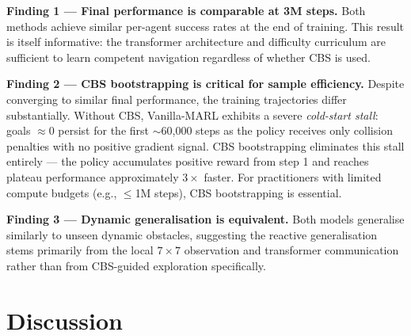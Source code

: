 \documentclass[letterpaper,twocolumn,10pt]{article}
\begin{document}
\begin{table}[h]
\centering
\caption{Ablation: CBS-Bootstrapped vs.\ Vanilla-MARL (no CBS). Per-agent success
  rate over 100 episodes; dynamic success under $K=4$ mixed obstacles over 50 episodes.}
\label{tab:ablation}
\end{table}

\textbf{Finding 1 --- Final performance is comparable at 3M steps.}
Both methods achieve similar per-agent success rates at the end of training. This
result is itself informative: the transformer architecture and difficulty curriculum
are sufficient to learn competent navigation regardless of whether CBS is used.

\textbf{Finding 2 --- CBS bootstrapping is critical for sample efficiency.}
Despite converging to similar final performance, the training trajectories differ
substantially. Without CBS, Vanilla-MARL exhibits a severe \emph{cold-start stall}:
goals $\approx 0$ persist for the first $\sim$60,000 steps as the policy receives
only collision penalties with no positive gradient signal. CBS bootstrapping eliminates
this stall entirely --- the policy accumulates positive reward from step 1 and
reaches plateau performance approximately $3\times$ faster. For practitioners with
limited compute budgets (e.g., $\leq$1M steps), CBS bootstrapping is essential.

\textbf{Finding 3 --- Dynamic generalisation is equivalent.}
Both models generalise similarly to unseen dynamic obstacles, suggesting the reactive
generalisation stems primarily from the local $7\times7$ observation and transformer
communication rather than from CBS-guided exploration specifically.

\section{Discussion}
\label{sec:discussion}
\end{document}
